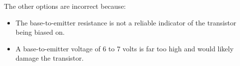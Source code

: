 The other options are incorrect because:
\begin{itemize}
    \item The base-to-emitter resistance is not a reliable indicator of the transistor being biased on.
    \item A base-to-emitter voltage of 6 to 7 volts is far too high and would likely damage the transistor.
\end{itemize}

